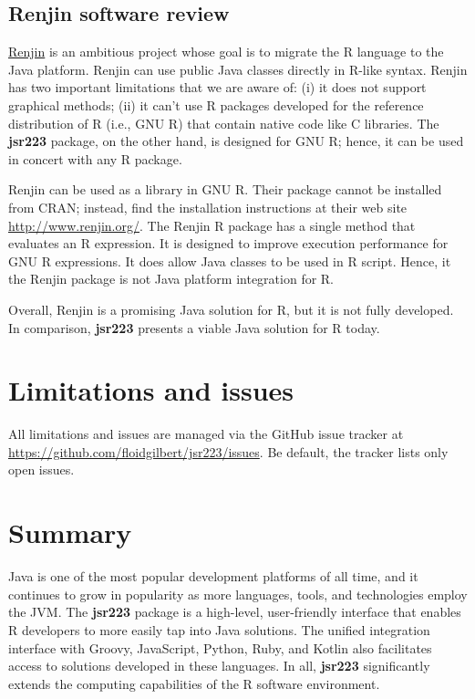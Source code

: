 \documentclass[
article,
11pt, %
a4paper, %
oneside, %
headinclude,footinclude, %
]{scrartcl}
\theoremstyle{definition} %
\theoremstyle{plain} %
\theoremstyle{remark} %
\newcommand{\pkg}[1]{\textbf{#1}}
\begin{document}
\subsection{Renjin software review}

\href{http://www.renjin.org/}{Renjin} is an ambitious project whose goal is to migrate the R language to the Java platform. Renjin can use public Java classes directly in R-like syntax. Renjin has two important limitations that we are aware of: (i) it does not support graphical methods; (ii) it can't use R packages developed for the reference distribution of R (i.e., GNU R) that contain native code like C libraries. The \pkg{jsr223} package, on the other hand, is designed for GNU R; hence, it can be used in concert with any R package.

Renjin can be used as a library in GNU R. Their package cannot be installed from CRAN; instead, find the installation instructions at their web site \url{http://www.renjin.org/}. The Renjin R package has a single method that evaluates an R expression. It is designed to improve execution performance for GNU R expressions. It does allow Java classes to be used in R script. Hence, it the Renjin package is not Java platform integration for R.

Overall, Renjin is a promising Java solution for R, but it is not fully developed. In comparison, \pkg{jsr223} presents a viable Java solution for R today.

\section{Limitations and issues}

All limitations and issues are managed via the GitHub issue tracker at \url{https://github.com/floidgilbert/jsr223/issues}. Be default, the tracker lists only open issues.

\section{Summary}

Java is one of the most popular development platforms of all time, and it continues to grow in popularity as more languages, tools, and technologies employ the JVM. The \pkg{jsr223} package is a high-level, user-friendly interface that enables R developers to more easily tap into Java solutions. The unified integration interface with Groovy, JavaScript, Python, Ruby, and Kotlin also facilitates access to solutions developed in these languages. In all, \pkg{jsr223} significantly extends the computing capabilities of the R software environment.
\end{document}
